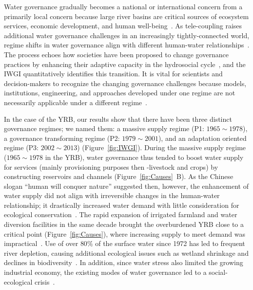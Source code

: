 
Water governance gradually becomes a national or international concern from a primarily local concern because large river basins are critical sources of ecosystem services, economic development, and human well-being~\cite{best2019,best2020}.
As tele-coupling raises additional water governance challenges in an increasingly tightly-connected world, regime shifts in water governance align with different human-water relationships~\cite{diaz2019}.
The process echoes how societies have been proposed to change governance practices by enhancing their adaptive capacity in the hydrosocial cycle~\cite{loch2020,turton1999}, and the IWGI quantitatively identifies this transition.
It is vital for scientists and decision-makers to recognize the changing governance challenges because models, institutions, engineering, and approaches developed under one regime are not necessarily applicable under a different regime~\cite{reyers2018}.

In the case of the YRB, our results show that there have been three distinct governance regimes; we named them: a massive supply regime (P1: $1965 \sim 1978$), a governance transforming regime (P2: $1979 \sim 2001$), and an adaptation oriented regime (P3: $2002 \sim 2013$) (Figure~\ref{fig:IWGI}).
During the massive supply regime ($1965 \sim 1978$ in the YRB), water governance thus tended to boost water supply for services (mainly provisioning purposes then -livestock and crops) by constructing reservoirs and channels (Figure~\ref{fig:Causes}~B).
As the Chinese slogan ``human will conquer nature'' suggested then, however, the enhancement of water supply did not align with irreversible changes in the human-water relationship; it drastically increased water demand with little consideration for ecological conservation~\cite{zhou2020}.
The rapid expansion of irrigated farmland and water diversion facilities in the same decade brought the overburdened YRB close to a critical point (Figure~\ref{fig:Causes}), where increasing supply to meet demand was impractical~\cite{loch2020}.
Use of over $80\%$ of the surface water since 1972 has led to frequent river depletion, causing additional ecological issues such as wetland shrinkage and declines in biodiversity~\cite{wang2019c}.
In addition, since water stress also limited the growing industrial economy, the existing modes of water governance led to a social-ecological crisis~\cite{wohlfart2016}.

